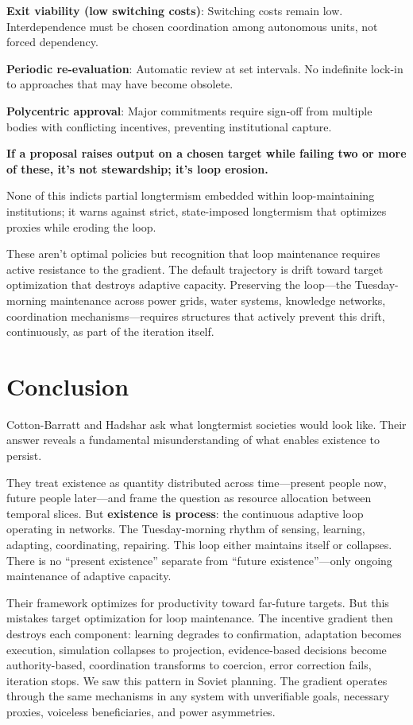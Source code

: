 \documentclass[12pt,a4paper]{article}
\begin{document}
\textbf{Exit viability (low switching costs)}: Switching costs remain low. Interdependence must be chosen coordination among autonomous units, not forced dependency.

\textbf{Periodic re-evaluation}: Automatic review at set intervals. No indefinite lock-in to approaches that may have become obsolete.

\textbf{Polycentric approval}: Major commitments require sign-off from multiple bodies with conflicting incentives, preventing institutional capture.

\textbf{If a proposal raises output on a chosen target while failing two or more of these, it's not stewardship; it's loop erosion.}

None of this indicts partial longtermism embedded within loop-maintaining institutions; it warns against strict, state-imposed longtermism that optimizes proxies while eroding the loop.

These aren't optimal policies but recognition that loop maintenance requires active resistance to the gradient. The default trajectory is drift toward target optimization that destroys adaptive capacity. Preserving the loop---the Tuesday-morning maintenance across power grids, water systems, knowledge networks, coordination mechanisms---requires structures that actively prevent this drift, continuously, as part of the iteration itself.

\section{Conclusion}

Cotton-Barratt and Hadshar ask what longtermist societies would look like. Their answer reveals a fundamental misunderstanding of what enables existence to persist.

They treat existence as quantity distributed across time---present people now, future people later---and frame the question as resource allocation between temporal slices. But \textbf{existence is process}: the continuous adaptive loop operating in networks. The Tuesday-morning rhythm of sensing, learning, adapting, coordinating, repairing. This loop either maintains itself or collapses. There is no ``present existence'' separate from ``future existence''---only ongoing maintenance of adaptive capacity.

Their framework optimizes for productivity toward far-future targets. But this mistakes target optimization for loop maintenance. The incentive gradient then destroys each component: learning degrades to confirmation, adaptation becomes execution, simulation collapses to projection, evidence-based decisions become authority-based, coordination transforms to coercion, error correction fails, iteration stops. We saw this pattern in Soviet planning. The gradient operates through the same mechanisms in any system with unverifiable goals, necessary proxies, voiceless beneficiaries, and power asymmetries.
\end{document}
